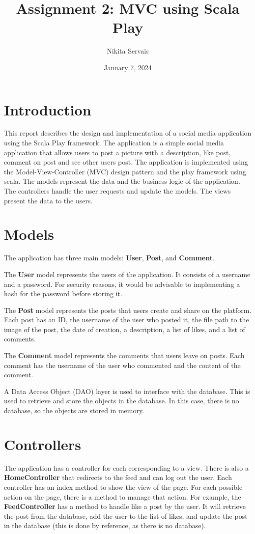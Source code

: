 \documentclass{article}
\author{Nikita Servais}
\title{Assignment 2: MVC using Scala Play}
\date{January 7, 2024}
\begin{document}
    \maketitle


    \section{Introduction}
    This report describes the design and implementation of a social media application using the Scala Play framework.
    The application is a simple social media application that allows users to post a picture with a description, like post, comment on post and see other users post.
    The application is implemented using the Model-View-Controller (MVC) design pattern and the play framework using scala.
    The models represent the data and the business logic of the application.
    The controllers handle the user requests and update the models.
    The views present the data to the users.


    \section{Models}
    The application has three main models: \textbf{User}, \textbf{Post}, and \textbf{Comment}.

    The \textbf{User} model represents the users of the application.
    It consists of a username and a password.
    For security reasons, it would be advisable to implementing a hash for the password before storing it.

    The \textbf{Post} model represents the posts that users create and share on the platform.
    Each post has an ID, the username of the user who posted it, the file path to the image of the post, the date of creation, a description, a list of likes, and a list of comments.


    The \textbf{Comment} model represents the comments that users leave on posts.
    Each comment has the username of the user who commented and the content of the comment.

    A Data Access Object (DAO) layer is used to interface with the database.
    This is used to retrieve and store the objects in the database.
    In this case, there is no database, so the objects are stored in memory.


    \section{Controllers}
    The application has a controller for each corresponding to a view.
    There is also a \textbf{HomeController} that redirects to the feed and can log out the user.
    Each controller has an index method to show the view of the page.
    For each possible action on the page, there is a method to manage that action.
    For example, the \textbf{FeedController} has a method to handle like a post by the user.
    It will retrieve the post from the database, add the user to the list of likes, and update the post in the database (this is done by reference, as there is no database).
\end{document}
